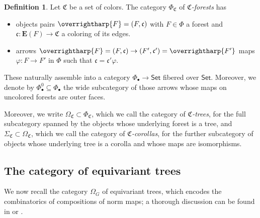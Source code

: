 \documentclass[a4paper,10pt
,draft
]{article}%
\numberwithin{equation}{section}
\numberwithin{figure}{section}
\theoremstyle{definition} %
\newtheorem{definition}[equation]{Definition}%
\newcommand{\vect}[1]{\text{\overrightharp{\ensuremath{#1}}}}
\newcommand{\Set}{\ensuremath{\mathsf{Set}}}
\newcommand{\1}{\ensuremath{\mathbbm 1}}%
\begin{document}
\begin{definition}\label{CFOREST_DEF}
      Let $\mathfrak C$ be a set of colors.
      The category $\Phi_{\mathfrak C}$ of \textit{$\mathfrak C$-forests} has
      \begin{itemize}
      \item objects pairs $\vect F = (F, \mathfrak c)$ with
            $F \in \Phi$ a forest and
            $\mathfrak c \colon \boldsymbol{E}(F) \to \mathfrak C$ a coloring of its edges.
      \item arrows $\vect F = (F, \mathfrak c) \to (F', \mathfrak c') = \vect{F'}$ maps
            $\varphi \colon F \to F'$ in $\Phi$ such that $\mathfrak c = \mathfrak c' \varphi$.
      \end{itemize}      

      These naturally assemble into a category $\Phi_\bullet \to \Set$ fibered over $\Set$.
      Moreover, we denote by
      $\Phi_\bullet^0 \subseteq \Phi_\bullet$
      the wide subcategory of those arrows whose maps on uncolored forests are outer faces.
      
      Moreover, we write
      $\Omega_{\mathfrak{C}} \subset \Phi_{\mathfrak{C}}$,
      which we call the category of 
      \emph{$\mathfrak{C}$-trees},
      for the full subcategory spanned by the objects 
      whose underlying forest is a tree,
      and 
      $\Sigma_{\mathfrak{C}} \subset \Omega_{\mathfrak{C}}$,
      which we call the category of 
      \emph{$\mathfrak{C}$-corollas},
      for the further subcategory of objects whose underlying tree is a corolla
      and whose maps are isomorphisms.
\end{definition}




\subsection{The category of equivariant trees}

We now recall the category $\Omega_G$ of equivariant trees, which encodes the combinatorics of compositions of norm maps;
a thorough discussion can be found in \cite{Per18} or \cite[\S 2]{BP_edss}.
\end{document}

